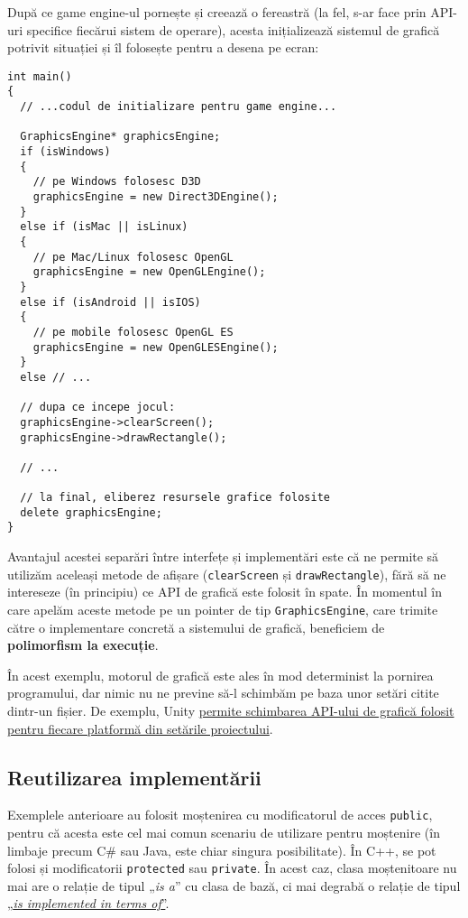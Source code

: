 După ce game engine-ul pornește și creează o fereastră (la fel, s-ar face prin API-uri specifice fiecărui sistem de operare), acesta inițializează sistemul de grafică potrivit situației și îl folosește pentru a desena pe ecran:
\begin{lstlisting}
int main()
{
  // ...codul de initializare pentru game engine...
  
  GraphicsEngine* graphicsEngine;
  if (isWindows)
  {
    // pe Windows folosesc D3D
    graphicsEngine = new Direct3DEngine();
  }
  else if (isMac || isLinux)
  {
    // pe Mac/Linux folosesc OpenGL
    graphicsEngine = new OpenGLEngine();
  }
  else if (isAndroid || isIOS)
  {
    // pe mobile folosesc OpenGL ES
    graphicsEngine = new OpenGLESEngine();
  }
  else // ...

  // dupa ce incepe jocul:
  graphicsEngine->clearScreen();
  graphicsEngine->drawRectangle();

  // ...

  // la final, eliberez resursele grafice folosite
  delete graphicsEngine;
}
\end{lstlisting}

Avantajul acestei separări între interfețe și implementări este că ne permite să utilizăm aceleași metode de afișare (\texttt{clearScreen} și \texttt{drawRectangle}), fără să ne intereseze (în principiu) ce API de grafică este folosit în spate. În momentul în care apelăm aceste metode pe un pointer de tip \texttt{GraphicsEngine}, care trimite către o implementare concretă a sistemului de grafică, beneficiem de \textbf{polimorfism la execuție}.

În acest exemplu, motorul de grafică este ales în mod determinist la pornirea programului, dar nimic nu ne previne să-l schimbăm pe baza unor setări citite dintr-un fișier. De exemplu, Unity \href{https://docs.unity3d.com/2019.4/Documentation/Manual/GraphicsAPIs.html}{permite schimbarea API-ului de grafică folosit pentru fiecare platformă din setările proiectului}.

\subsection*{Reutilizarea implementării}

Exemplele anterioare au folosit moștenirea cu modificatorul de acces \texttt{public}, pentru că acesta este cel mai comun scenariu de utilizare pentru moștenire (în limbaje precum C\# sau Java, este chiar singura posibilitate). În C++, se pot folosi și modificatorii \texttt{protected} sau \texttt{private}. În acest caz, clasa moștenitoare nu mai are o relație de tipul „\emph{is a}” cu clasa de bază, ci mai degrabă o relație de tipul \href{https://stackoverflow.com/a/1374362/5723188}{„\emph{is implemented in terms of}”}.

